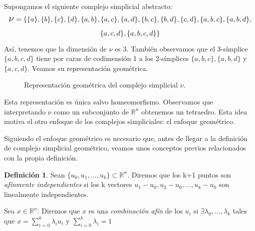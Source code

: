 \documentclass[12pt, a4paper]{article}
\numberwithin{equation}{section}
\theoremstyle{definition}
\newtheorem{defi}{Definición}
\newenvironment{ejem}
  {\pushQED{\qed}\renewcommand{\qedsymbol}{$\blacktriangleleft$}\ejemplo}
  {\popQED\endejemplo}
\theoremstyle{remark}
\theoremstyle{plain}
\begin{document}
	\begin{ejem}
		Supongamos el siguiente complejo simplicial abstracto:
		\begin{multline*} 
			\text{{\Large $\nu$}}=\{\{a\},\{b\},\{c\},\{d\},
			\{a,b\},\{a,c\},\{a,d\},\{b,c\},\{b,d\},\{c,d\},
			\{a,b,c\},\{a,b,d\},\\
			\{a,c,d\},\{a,b,c,d\}\}
		\end{multline*}
		Así, tenemos que la dimensión de {\Large $\nu$} es 3. También 
		observamos que el 3-símplice $\{a,b,c,d\}$ tiene por caras de 
		codimensión 1 a los 2-símplices $\{a,b,c\},\{a,b,d\}$ y 
		$\{a,c,d\}$. Veamos su representación geométrica.

		\begin{figure}[H]
			\centering
			\caption{Representación geométrica del complejo 
			simplicial {\Large $\nu$}.}
		\end{figure}

		Esta representación es única salvo homeomorfismo. Observamos 
		que interpretando {\Large $\nu$} como un subconjunto de 
		$\mathbb{R}^{n}$ obtenemos un tetraedro. Esta idea motiva el 
		otro enfoque de los complejos simpliciales: el enfoque 
		geométrico.
	\end{ejem}

	Siguiendo el enfoque geométrico es necesario que, antes de llegar a la
	definición de complejo simplicial geométrico, veamos unos conceptos 
	previos relacionados con la propia definición.

	\begin{defi}
		Sean $\{u_{0},u_{1},...,u_{k}\}\subset\mathbb{R}^{n}$. Diremos
		que los k+1 puntos son \textit{afínmente independientes} si 
		los k vectores $u_{1}-u_{0},u_{2}-u_{0},...,u_{k}-u_{0}$ son
		linealmente independientes.

		Sea $x \in \mathbb{R}^{n}$. Diremos que $x$ es una 
		\textit{combinación afín} de los $u_{i}$ si $\exists 
		\lambda_{0},...,\lambda_{k}$ tales que 
		$x=\sum_{i=0}^{k}\lambda_{i}u_{i}$ y 
		$\sum_{i=0}^{k}\lambda_{i}=1$
	\end{defi}
\end{document}
